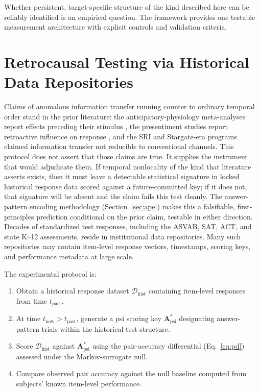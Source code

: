 \documentclass[11pt,letterpaper]{article}
\begin{document}
Whether persistent, target-specific structure of the kind described here can be reliably identified is an empirical question. The framework provides one testable measurement architecture with explicit controls and validation criteria.

\clearpage
\appendix

\section{Retrocausal Testing via Historical Data Repositories}
\label{app:retro}

Claims of anomalous information transfer running counter to ordinary temporal order stand in the prior literature: the anticipatory-physiology meta-analyses report effects preceding their stimulus \cite{mossbridge2012}, the presentiment studies report retroactive influence on response \cite{bem2011}, and the SRI and Stargate-era programs claimed information transfer not reducible to conventional channels. This protocol does not assert that those claims are true. It supplies the instrument that would adjudicate them. If temporal nonlocality of the kind that literature asserts exists, then it must leave a detectable statistical signature in locked historical response data scored against a future-committed key; if it does not, that signature will be absent and the claim fails this test cleanly. The answer-pattern encoding methodology (Section~\ref{sec:ape}) makes this a falsifiable, first-principles prediction conditional on the prior claim, testable in either direction. Decades of standardized test responses, including the ASVAB, SAT, ACT, and state K--12 assessments, reside in institutional data repositories. Many such repositories may contain item-level response vectors, timestamps, scoring keys, and performance metadata at large scale.

The experimental protocol is:

\begin{enumerate}[nosep]
    \item Obtain a historical response dataset $\mathcal{D}_{\text{hist}}$ containing item-level responses from time $t_{\text{past}}$.
    \item At time $t_{\text{now}} > t_{\text{past}}$, generate a psi scoring key $\mathbf{A}^*_{\text{psi}}$ designating answer-pattern trials within the historical test structure.
    \item Score $\mathcal{D}_{\text{hist}}$ against $\mathbf{A}^*_{\text{psi}}$ using the pair-accuracy differential (Eq.~\ref{eq:pd}) assessed under the Markov-surrogate null.
    \item Compare observed pair accuracy against the null baseline computed from subjects' known item-level performance.
\end{enumerate}
\end{document}
